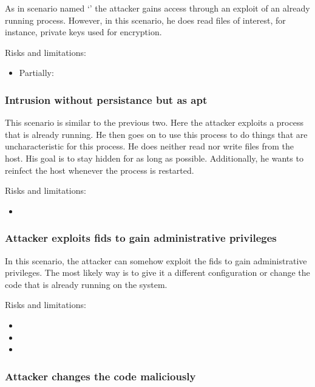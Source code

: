 As in scenario named `' the attacker gains access through an exploit of an already running process. However, in this scenario, he does read files of interest, for instance, private keys used for encryption. 

Risks and limitations:
\begin{itemize}
	\item Partially: 
\end{itemize}

\subsubsection{Intrusion without persistance but as \gls{apt}}
\label{sec:attack:nopersistanceapt}

This scenario is similar to the previous two. Here the attacker exploits a process that is already running. He then goes on to use this process to do things that are uncharacteristic for this process. He does neither read nor write files from the host. His goal is to stay hidden for as long as possible. Additionally, he wants to reinfect the host whenever the process is restarted.

Risks and limitations:
\begin{itemize}
	\item {}
\end{itemize}

\subsubsection{Attacker exploits \gls{fids} to gain administrative privileges}
\label{sec:attack:exploitforroot}

In this scenario, the attacker can somehow exploit the \gls{fids} to gain administrative privileges. The most likely way is to give it a different configuration or change the code that is already running on the system. 

Risks and limitations:
\begin{itemize}
	\item {}
	\item {}
	\item {}
\end{itemize}

\subsubsection{Attacker changes the code maliciously}
\label{sec:attack:codechange}

